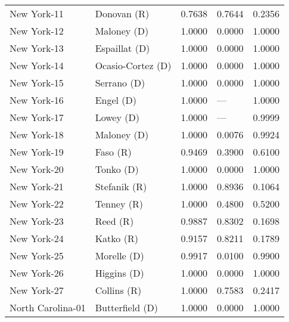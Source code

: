 \begin{longtable}{llrll}
       New York-11 &          {\color{Red} Donovan (R)} &       0.7638 &        0.7644 &        0.2356 \\
       New York-12 &         {\color{Blue} Maloney (D)} &       1.0000 &        0.0000 &        1.0000 \\
       New York-13 &       {\color{Blue} Espaillat (D)} &       1.0000 &        0.0000 &        1.0000 \\
       New York-14 &   {\color{Blue} Ocasio-Cortez (D)} &       1.0000 &        0.0000 &        1.0000 \\
       New York-15 &         {\color{Blue} Serrano (D)} &       1.0000 &        0.0000 &        1.0000 \\
       New York-16 &           {\color{Blue} Engel (D)} &       1.0000 &           --- &        1.0000 \\
       New York-17 &           {\color{Blue} Lowey (D)} &       1.0000 &           --- &        0.9999 \\
       New York-18 &         {\color{Blue} Maloney (D)} &       1.0000 &        0.0076 &        0.9924 \\
       New York-19 &             {\color{Red} Faso (R)} &       0.9469 &        0.3900 &        0.6100 \\
       New York-20 &           {\color{Blue} Tonko (D)} &       1.0000 &        0.0000 &        1.0000 \\
       New York-21 &         {\color{Red} Stefanik (R)} &       1.0000 &        0.8936 &        0.1064 \\
       New York-22 &           {\color{Red} Tenney (R)} &       1.0000 &        0.4800 &        0.5200 \\
       New York-23 &             {\color{Red} Reed (R)} &       0.9887 &        0.8302 &        0.1698 \\
       New York-24 &            {\color{Red} Katko (R)} &       0.9157 &        0.8211 &        0.1789 \\
       New York-25 &         {\color{Blue} Morelle (D)} &       0.9917 &        0.0100 &        0.9900 \\
       New York-26 &         {\color{Blue} Higgins (D)} &       1.0000 &        0.0000 &        1.0000 \\
       New York-27 &          {\color{Red} Collins (R)} &       1.0000 &        0.7583 &        0.2417 \\
 North Carolina-01 &     {\color{Blue} Butterfield (D)} &       1.0000 &        0.0000 &        1.0000 \\

\end{longtable}
